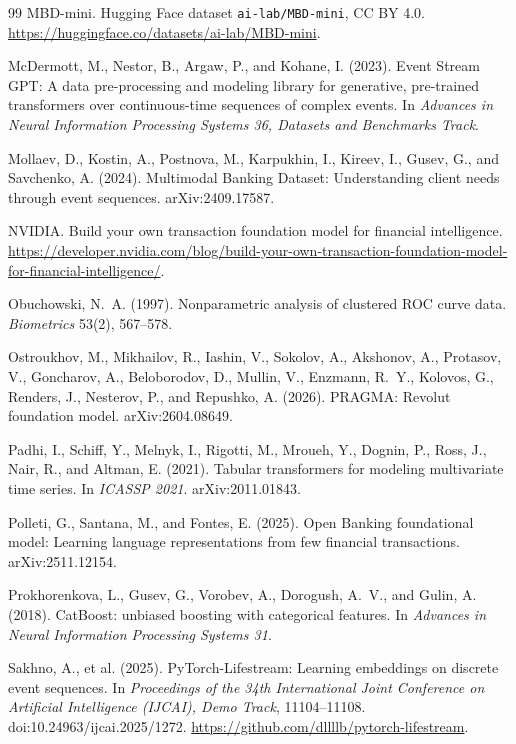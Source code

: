 \documentclass[12pt]{article}
\newcommand{\tok}[1]{\texttt{#1}}
\begin{document}
\begin{thebibliography}{99}
 MBD-mini. Hugging Face dataset \tok{ai-lab/MBD-mini}, CC BY 4.0.
\url{https://huggingface.co/datasets/ai-lab/MBD-mini}.

 McDermott, M., Nestor, B., Argaw, P., and Kohane, I. (2023). Event Stream GPT: A data pre-processing and modeling library for generative, pre-trained transformers over continuous-time sequences of complex events. In \emph{Advances in Neural Information Processing Systems 36, Datasets and Benchmarks Track}.

 Mollaev, D., Kostin, A., Postnova, M., Karpukhin, I., Kireev, I., Gusev, G., and Savchenko, A. (2024). Multimodal Banking Dataset: Understanding client needs through event sequences. arXiv:2409.17587.

 NVIDIA. Build your own transaction foundation model for financial intelligence.
\url{https://developer.nvidia.com/blog/build-your-own-transaction-foundation-model-for-financial-intelligence/}.

 Obuchowski, N.~A. (1997). Nonparametric analysis of clustered ROC curve data.
\emph{Biometrics} 53(2), 567--578.

 Ostroukhov, M., Mikhailov, R., Iashin, V., Sokolov, A., Akshonov, A., Protasov, V.,
Goncharov, A., Beloborodov, D., Mullin, V., Enzmann, R.~Y., Kolovos, G., Renders, J., Nesterov, P., and Repushko, A. (2026). PRAGMA: Revolut foundation model. arXiv:2604.08649.

 Padhi, I., Schiff, Y., Melnyk, I., Rigotti, M., Mroueh, Y., Dognin, P., Ross, J., Nair, R., and Altman, E. (2021). Tabular transformers for modeling multivariate time series. In \emph{ICASSP 2021}. arXiv:2011.01843.

 Polleti, G., Santana, M., and Fontes, E. (2025). Open Banking foundational model: Learning language representations from few financial transactions. arXiv:2511.12154.

 Prokhorenkova, L., Gusev, G., Vorobev, A., Dorogush, A.~V., and Gulin, A. (2018).
CatBoost: unbiased boosting with categorical features. In \emph{Advances in Neural Information
Processing Systems 31}.

 Sakhno, A., et al. (2025). PyTorch-Lifestream: Learning embeddings on discrete event sequences. In \emph{Proceedings of the 34th International Joint Conference on Artificial Intelligence (IJCAI), Demo Track}, 11104--11108. doi:10.24963/ijcai.2025/1272.
\url{https://github.com/dllllb/pytorch-lifestream}.


\end{thebibliography}
\end{document}
